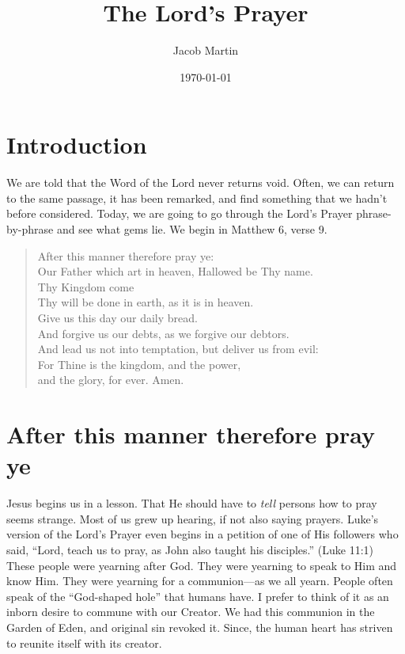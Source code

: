 \documentclass[12pt]{article}
\author{Jacob Martin}
\date{\today}
\title{The Lord's Prayer}
\begin{document}
\maketitle

\section{Introduction}

We are told that the Word of the Lord never returns void.  Often, we can return to the same passage, it has been remarked, and find something that we hadn't before considered.  Today, we are going to go through the Lord's Prayer phrase-by-phrase and see what gems lie.  We begin in Matthew 6, verse 9.
\begin{quote}
After this manner therefore pray ye: \\
Our Father which art in heaven, Hallowed be Thy name. \\
Thy Kingdom come \\
Thy will be done in earth, as it is in heaven. \\
Give us this day our daily bread. \\
And forgive us our debts, as we forgive our debtors. \\
And lead us not into temptation, but deliver us from evil: \\
For Thine is the kingdom, and the power, \\
and the glory, for ever. Amen.
\end{quote}

\section{After this manner therefore pray ye}
\label{sec-2}
Jesus begins us in a lesson.  That He should have to \emph{tell} persons how to pray seems strange.  Most of us grew up hearing, if not also saying prayers.  Luke's version of the Lord's Prayer even begins in a petition of one of His followers who said, ``Lord, teach us to pray, as John also taught his disciples.''  (Luke 11:1) These people were yearning after God.  They were yearning to speak to Him and know Him.  They were yearning for a communion---as we all yearn.  People often speak of the ``God-shaped hole'' that humans have.  I prefer to think of it as an inborn desire to commune with our Creator.  We had this communion in the Garden of Eden, and original sin revoked it.  Since, the human heart has striven to reunite itself with its creator.
\end{document}
